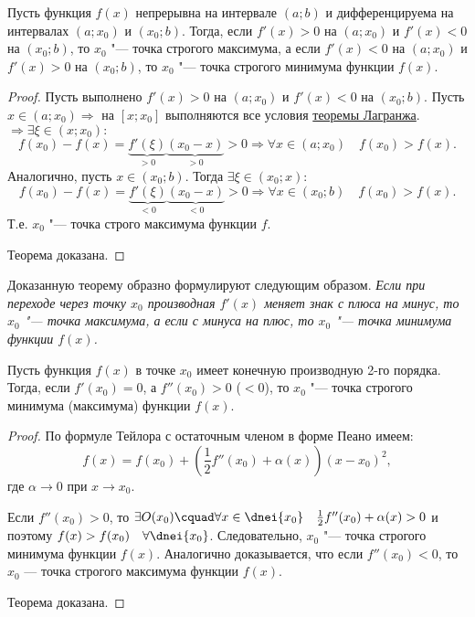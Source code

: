 \begin{thm} Пусть функция $f(x)$ непрерывна на интервале $(a;b)$ и дифференцируема на интервалах $(a;x_0)$ и $(x_0;b)$. Тогда, если $f'(x) > 0$ на $(a;x_0)$ и $f'(x) < 0$ на $(x_0;b)$, то $x_0$ "--- точка строгого максимума, а если $f'(x) < 0$ на $(a;x_0)$ и $f'(x) > 0$ на $(x_0;b)$, то $x_0$ "--- точка строгого минимума функции $f(x)$.
\end{thm}
\begin{proof}
    Пусть выполнено $f'(x) > 0$ на $(a;x_0)$ и $f'(x) < 0$ на $(x_0;b)$. Пусть $x \in (a;x_0) \Rightarrow$ на $[x;x_0]$ выполняются все условия \hyperref[ch4t1]{теоремы Лагранжа}. $\Rightarrow \exists \xi \in (x;x_0):$ 
$$
f(x_0)-f(x) = \underbrace{f'(\xi)}_{>0} \underbrace{(x_0-x)}_{>0} >0 \Rightarrow \forall x \in (a;x_0)\quad f(x_0) > f(x).
$$
Аналогично, пусть $x\in(x_0;b)$. Тогда $\exists \xi \in (x_0;x):$
$$
f(x_0)-f(x) = \underbrace{f'(\xi)}_{<0} \underbrace{(x_0-x)}_{<0} >0 \Rightarrow \forall x \in (x_0;b) \quad f(x_0) > f(x).
$$
Т.е. $x_0$ "--- точка строго максимума функции $f$.

Теорема доказана.
\end{proof}
Доказанную теорему образно формулируют следующим образом. \textit{Если при переходе через точку $x_0$ производная $f'(x)$ меняет знак с плюса на минус, то $x_0$ "--- точка максимума, а если с минуса на плюс, то $x_0$ "--- точка минимума функции $f(x)$.}
\begin{thm}  Пусть функция $f(x)$ в точке $x_0$ имеет конечную производную 2-го порядка. Тогда, если $f'(x_0) = 0$, а $f''(x_0) > 0$ \textup{($<0$)}, то $x_0$ "--- точка строгого минимума (максимума) функции $f(x)$.
\end{thm}

\begin{proof}
По формуле Тейлора с остаточным членом в форме Пеано имеем:	
$$
f(x)=f(x_0)+\left(\frac{1}{2}f''(x_0)+\alpha(x)\right)(x-x_0)^2,
$$
где $\alpha \to 0$ при $x \to x_0$.
 
Если $f''(x_0) > 0$, то $\exists O(x_0)\cquad \forall x\in\dnei{x_0}\quad\frac{1}{2}f''(x_0)+\alpha(x)>0$
и поэтому $f(x) > f(x_0)\quad \forall \dnei{x_0}$. Следовательно, $x_0$ "--- точка строгого минимума функции $f(x)$.
Аналогично доказывается, что если $ f''(x_0) < 0$, то $x_0$ — точка строгого максимума функции $f(x)$.

Теорема доказана.
\end{proof}


